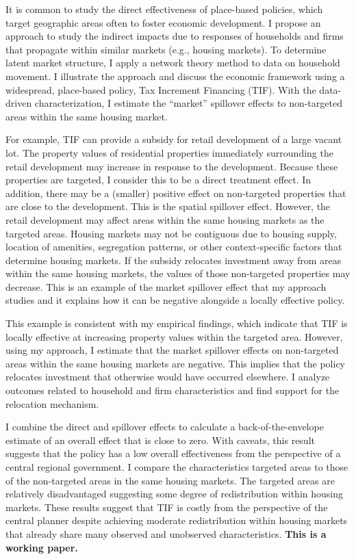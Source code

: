 It is common to study the direct effectiveness of place-based policies, which target geographic areas often to foster economic development. I propose an approach to study the indirect impacts due to responses of households and firms that propagate within similar markets (e.g., housing markets). To determine latent market structure, I apply a network theory method to data on household movement. I illustrate the approach and discuss the economic framework using a widespread, place-based policy, Tax Increment Financing (TIF). With the data-driven characterization, I estimate the ``market'' spillover effects to non-targeted areas within the same housing market. 

For example, TIF can provide a subsidy for retail development of a large vacant lot. The property values of residential properties immediately surrounding the retail development may increase in response to the development. Because these properties are targeted, I consider this to be a direct treatment effect. In addition, there may be a (smaller) positive effect on non-targeted properties that are close to the development. This is the spatial spillover effect. However, the retail development may affect areas within the same housing markets as the targeted areas. Housing markets may not be contiguous due to housing supply, location of amenities, segregation patterns, or other context-specific factors that determine housing markets. If the subsidy relocates investment away from areas within the same housing markets, the values of those non-targeted properties may decrease. This is an example of the market spillover effect that my approach studies and it explains how it can be negative alongside a locally effective policy.

This example is consistent with my empirical findings, which indicate that TIF is locally effective at increasing property values within the targeted area. However, using my approach, I estimate that the market spillover effects on non-targeted areas within the same housing markets are negative. This implies that the policy relocates investment that otherwise would have occurred elsewhere. I analyze outcomes related to household and firm characteristics and find support for the relocation mechanism. 

I combine the direct and spillover effects to calculate a back-of-the-envelope estimate of an overall effect that is close to zero. With caveats, this result suggests that the policy has a low overall effectiveness from the perspective of a central regional government. I compare the characteristics targeted areas to those of the non-targeted areas in the same housing markets. The targeted areas are relatively disadvantaged suggesting some degree of redistribution within housing markets. These results suggest that TIF is costly from the perspective of the central planner despite achieving moderate redistribution within housing markets that already share many observed and unobserved characteristics. \textbf{This is a working paper.}

